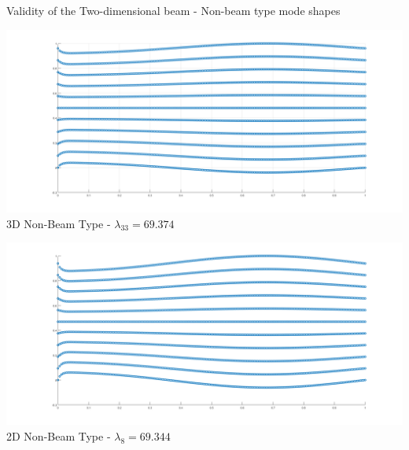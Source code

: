 \documentclass[8pt]{beamer}
\begin{document}
        \begin{frame}{Validity of the Two-dimensional beam - Non-beam type mode shapes}
            \centering
            \begin{minipage}[b]{0.45\textwidth}
                \includegraphics[width=\textwidth]{3D33.png}
                \\ 3D Non-Beam Type - $\lambda_{33} = 69.374$
                \label{fig:minipage6}
            \end{minipage}
            \hfill
            \begin{minipage}[b]{0.45\textwidth}
                \includegraphics[width=\textwidth]{2D8.png}
                \\ 2D Non-Beam Type - $\lambda_8 = 69.344$
                \label{fig:minipage5}
            \end{minipage}
        
            \vspace{1em} %
        

\end{frame}
\end{document}
